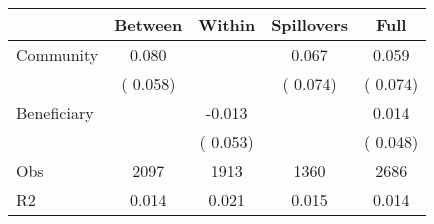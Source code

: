 
\begin{tabular}{l*{4}{c}}\hline&\multicolumn{1}{c}{Between}&\multicolumn{1}{c}{Within}&\multicolumn{1}{c}{Spillovers}&\multicolumn{1}{c}{Full}\\ \hline
 Community             &              0.080      &                                               &        0.067 &         0.059                            \\ 
                               &        (       0.058)           &                                       &       (       0.074)     &      (       0.074)                                           \\ 
 Beneficiary   &                                               &       -0.013    &                                &             0.014                            \\ 
                               &                                               & (       0.053)                  &                                        &      (       0.048)                                           \\ 
\hline                                                                                                                                                                                                                                            
 Obs                   &               2097               &       1913                       &       1360                &              2686                                               \\ 
 R2                    &                      0.014              &              0.021                      &              0.015               &                     0.014                                              \\ 
\hline \end{tabular}                                                                                                                                                                                                              
